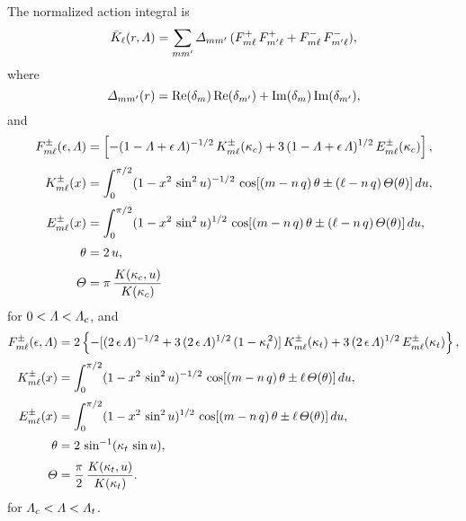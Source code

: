 \documentclass[12pt,prb,aps,notitlepage]{revtex4-1}
\begin{document}
The normalized action integral is
\begin{align}
\bar{K}_\ell(r,{\mit\Lambda}) =\sum_{mm'}{\mit\Delta}_{mm'}\,(F^+_{m\ell}\,F^+_{m'\ell} +F^-_{m\ell}\,F^-_{m'\ell}),
\end{align}
where
\begin{equation}
{\mit\Delta}_{mm'} (r)= {\rm Re}(\delta_m)\,{\rm Re}(\delta_{m'})+ {\rm Im}(\delta_m)\,{\rm Im}(\delta_{m'}),
\end{equation}
and
\begin{align}
F_{m\ell}^\pm(\epsilon,{\mit\Lambda}) &= \left[-(1-{\mit\Lambda}+\epsilon\,{\mit\Lambda})^{-1/2}\,K^\pm_{m\ell}(\kappa_c) + 3\,(1-{\mit\Lambda}+\epsilon\,{\mit\Lambda})^{1/2}\,
E^\pm_{m\ell}(\kappa_c)\right],\\[0.5ex]
K^\pm_{m\ell}(x) &= \int_0^{\pi/2} (1-x^2\,\sin^2 u)^{-1/2}\,\cos[(m-n\,q)\,\theta \pm (\ell -n\,q)\,{\mit\Theta}(\theta)]\,du,\\[0.5ex]
E^\pm_{m\ell}(x) &= \int_0^{\pi/2} (1-x^2\,\sin^2 u)^{1/2}\,\cos[(m-n\,q)\,\theta \pm (\ell -n\,q)\,{\mit\Theta}(\theta)]\,du,\\[0.5ex]
 \theta&=2\,u,\\[0.5ex]
 {\mit\Theta} &= \pi\,\frac{K(\kappa_c,u)}{K(\kappa_c)}
 \end{align}
 for $0<{\mit\Lambda}<{\mit\Lambda}_c$,
 and 
 \begin{align}
F_{m\ell}^\pm(\epsilon,{\mit\Lambda}) &= 2\left\{-[(2\,\epsilon\,{\mit\Lambda})^{-1/2}+3\,(2\,\epsilon\,{\mit\Lambda})^{1/2}\,(1-\kappa_t^{\,2})]\,K^\pm_{m\ell}(\kappa_t) + 3\,(2\,\epsilon\,{\mit\Lambda})^{1/2}\,E^\pm_{m\ell}(\kappa_t)\right\},\\[0.5ex]
K^\pm_{m\ell}(x) &= \int_0^{\pi/2} (1-x^2\,\sin^2 u)^{-1/2}\,\cos[(m-n\,q)\,\theta \pm \ell\,{\mit\Theta}(\theta)]\,du,\\[0.5ex]
E^\pm_{m\ell}(x) &= \int_0^{\pi/2} (1-x^2\,\sin^2 u)^{1/2}\,\cos[(m-n\,q)\,\theta \pm \ell \,{\mit\Theta}(\theta)]\,du,\\[0.5ex]
\theta&=2\,\sin^{-1}(\kappa_t\,\sin u),\\[0.5ex]
{\mit\Theta}&= \frac{\pi}{2}\,\frac{K(\kappa_t,u)}{K(\kappa_t)}.
\end{align}
for ${\mit\Lambda}_c<{\mit\Lambda}<{\mit\Lambda}_t$. 
\end{document}
